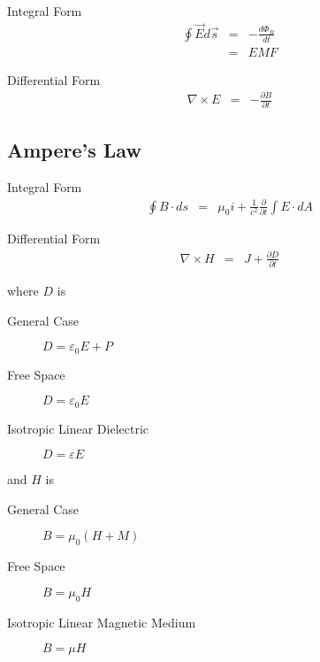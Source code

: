 Integral Form
\begin{eqnarray}
\oint\vec{E}d\vec{s}
&=& -\frac{d\Phi_B}{dt}\\
&=& EMF
\end{eqnarray}

Differential Form
\begin{eqnarray}
\nabla\times E
&=& -\frac{\partial B}{\partial t}
\end{eqnarray}


\subsection{Ampere's Law}

Integral Form
\begin{eqnarray}
\oint B\cdot ds
&=& \mu_0i+\frac{1}{c^2}\frac{\partial}{\partial t}\int E\cdot dA
\end{eqnarray}

Differential Form
\begin{eqnarray}
\nabla\times H
&=& J+\frac{\partial D}{\partial t}
\end{eqnarray}


where $D$ is
\begin{description}
\item[General Case] $D = \varepsilon_0E+P$
\item[Free Space] $D = \varepsilon_0E$
\item[Isotropic Linear Dielectric] $D = \varepsilon E$
\end{description}
and $H$ is
\begin{description}
\item[General Case] $B = \mu_0(H+M)$
\item[Free Space] $B = \mu_0H$
\item[Isotropic Linear Magnetic Medium] $B = \mu H$
\end{description} 